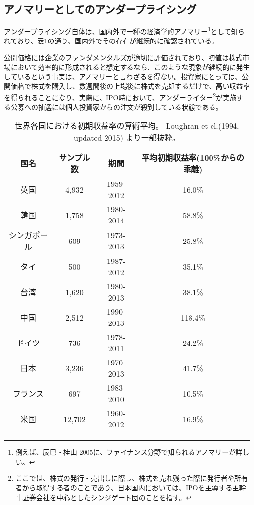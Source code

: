 \documentclass{jsarticle}
\begin{document}
\subsection{アノマリーとしてのアンダープライシング}
アンダープライシング自体は、国内外で一種の経済学的アノマリー\footnote[3]{例えば、辰巳・桂山 2005\cite{tatsumi}に、ファイナンス分野で知られるアノマリーが詳しい。}として知られており、表\ref{around_world}の通り、国内外でその存在が継続的に確認されている。 \par
公開価格には企業のファンダメンタルズが適切に評価されており、初値は株式市場において効率的に形成されると想定するなら、このような現象が継続的に発生しているという事実は、アノマリーと言わざるを得ない。投資家にとっては、公開価格で株式を購入し、数週間後の上場後に株式を売却するだけで、高い収益率を得られることになり、実際に、IPO時において、アンダーライター\footnote[4]{ここでは、株式の発行・売出しに際し、株式を売れ残った際に発行者や所有者から取得する者のことであり、日本国内においては、IPOを主導する主幹事証券会社を中心としたシンジゲート団のことを指す。}が実施する公募への抽選には個人投資家からの注文が殺到している状態である。

\begin{table}[t]
	\caption{世界各国における初期収益率の算術平均。
	Loughran et el.(1994, updated 2015) \cite{Loughran}より一部抜粋。}
	\label{around_world}
	\centering
	\begin{tabular}{cccc}
		\hline
		国名&サンプル数&期間&平均初期収益率(100\%からの乖離) \\
		\hline \hline
		英国&4,932&1959-2012&16.0\% \\
		韓国&1,758&1980-2014& 58.8\% \\
		シンガポール&609&1973-2013&25.8\% \\
		タイ&500&1987-2012&35.1\%\\
		台湾 &1,620 &1980-2013&38.1\% \\
		中国&2,512&1990-2013&118.4\%\\
		ドイツ&736&1978-2011&24.2\% \\
		日本&3,236&1970-2013&41.7\% \\
		フランス & 697 & 1983-2010 & 10.5\% \\
		米国&12,702&1960-2012&16.9\%\\
		\hline
	\end{tabular}
\end{table}
\end{document}
